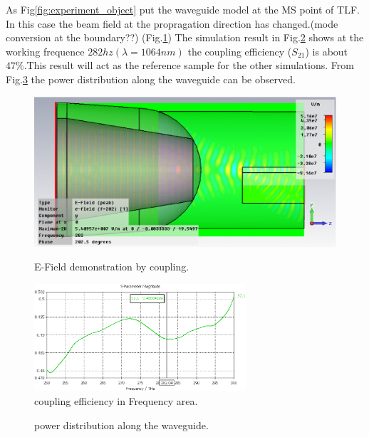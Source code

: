 As Fig\ref{fig:experiment_object} put  the  waveguide model at the MS point of TLF. In this case the beam field at the propragation direction has changed.(mode conversion at the boundary??) (Fig.\ref{fig:coupling_e_field}) The simulation result in Fig.\ref{fig:orignial_coupling_efficiency} shows at the working frequence $282hz(\lambda=1064 nm)$ the coupling efficiency ($S_{21}$) is about $47\%$.This result will act as the reference sample for the other simulations. From Fig.\ref{fig:power_distribution} the power distribution along the waveguide can be observed. 


\begin{figure}
\centering
	\includegraphics[width=0.5 \textwidth]{bilder/basic_waveguide_efield}
	\label{fig:coupling_e_field}
	\caption{E-Field demonstration by  coupling.}
\end{figure}

\begin{figure}
\centering
\includegraphics[width=0.7\textwidth]{bilder/cst_basic_waveguide_S21}
\caption{coupling efficiency in Frequency area.}
\label{fig:orignial_coupling_efficiency}
\end{figure}


\begin{figure}
\centering
\caption{power distribution along the waveguide.}
\label{fig:power_distribution}
\end{figure}


